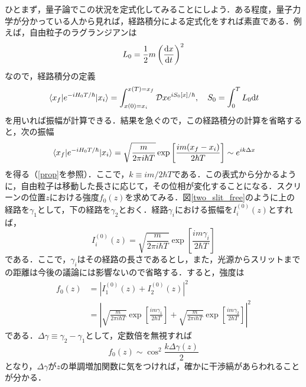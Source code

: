 \documentclass[a4paper,pdflatex,ja=standard]{bxjsarticle}
\begin{document}
ひとまず，量子論でこの状況を定式化してみることにしよう．ある程度，量子力学が分かっている人から見れば，経路積分による定式化をすれば素直である．例えば，自由粒子のラグランジアンは
\begin{equation}
  L_0
  =
  \frac{1}{2}m\left( \dv{x}{t} \right)^2
  \label{lagrangian_free}
\end{equation}
なので，経路積分の定義
\begin{equation}
  \ev*{x_{f}|e^{-iH_{0}T/\hbar}|x_i}
  =
  \int_{x(0)=x_i}^{x(T)=x_f}\mathcal{D}x
  e^{iS_{0}[x]/\hbar}
  ,\quad
  S_{0}
  =
  \int_{0}^{T}L_{0}
  \dd t
\end{equation}
を用いれば振幅が計算できる．結果を急ぐので，この経路積分の計算を省略すると，次の振幅
\begin{equation}
  \ev*{x_{f}|e^{-iH_{0}T/\hbar}|x_i}
  =
  \sqrt{\frac{m}{2\pi i\hbar T}}
  \exp
  \left[  
    \frac{im(x_f-x_i)}{2\hbar T}
  \right]
  \sim
  e^{ik\Delta x}
  \label{prop_free}
\end{equation}
を得る（\ref{prop}を参照）．ここで，$k\equiv im/2\hbar T$である．この表式から分かるように，自由粒子は移動した長さに応じて，その位相が変化することになる．スクリーンの位置$z$における強度$f_{0}(z)$を求めてみる．図\ref{two_slit_free}のように上の経路を$\gamma_1$として，下の経路を$\gamma_2$とおく．経路$\gamma_i$における振幅を$I^{(0)}_{i}(z)$とすれば，
\begin{equation}
  I_{i}^{(0)}(z)
  =  
  \sqrt{\frac{m}{2\pi i\hbar T}}
  \exp
  \left[  
    \frac{im\gamma_{i}}{2\hbar T}
  \right]
\end{equation}
である．ここで，$\gamma_{i}$はその経路の長さであるとし，また，光源からスリットまでの距離は今後の議論には影響ないので省略する．すると，強度は
\begin{align}
  f_0(z)
  &=
  \left|
    I^{(0)}_{1}(z)
    +
    I^{(0)}_{2}(z)
  \right|^2
  \nonumber
  \\
  &=
  \left|
    \sqrt{\frac{m}{2\pi i\hbar T}}
    \exp
    \left[  
      \frac{im\gamma_{1}}{2\hbar T}
    \right]
    +
    \sqrt{\frac{m}{2\pi i\hbar T}}
    \exp
    \left[  
      \frac{im\gamma_{2}}{2\hbar T}
    \right]
  \right|^2
\end{align}
である．$\Delta\gamma\equiv\gamma_2-\gamma_1$として，定数倍を無視すれば
\begin{equation}
  f_0(z)
  \sim
  \cos^2\frac{k\Delta\gamma(z)}{2}
  \label{intensive_free}
\end{equation}
となり，$\Delta\gamma$が$z$の単調増加関数に気をつければ，確かに干渉縞があらわれることが分かる．
\end{document}
